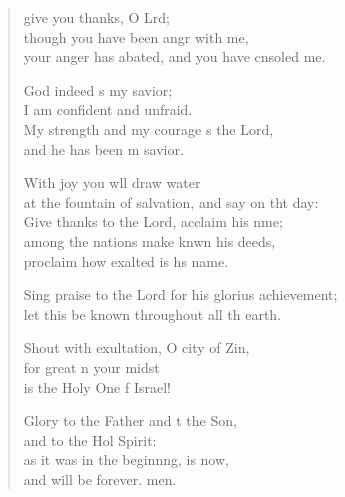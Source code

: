 \begin{verse}
  \begin{patverse}
     give you thanks, O Lrd;\Flex\\
though you have been angr with me,\Med\\
your anger has abated, and you have cnsoled me.

God indeed \pointup{\i}s my savior;\Med\\
I am confident and unfraid.\\
My strength and my courage \pointup{\i}s the Lord,\Med\\
and he has been m savior.

With joy you w\pointup{\i}ll draw water\Med\\
at the fountain of salvation, and say on tht day:\\
Give thanks to the Lord, acclaim his nme;\Flex\\
among the nations make knwn his deeds,\Med\\
proclaim how exalted is h\pointup{\i}s name.

Sing praise to the Lord for his glorius achievement;\Med\\
let this be known throughout all th earth.

Shout with exultation, O city of Zin,\Flex\\
for great \pointup{\i}n your midst\Med\\
is the Holy One f Israel!

Glory to the Father and t the Son,\Med\\
and to the Hol Spirit:\\
as it was in the beginn\pointup{\i}ng, is now,\Med\\
and will be forever. men. 
  \end{patverse}
\end{verse}
